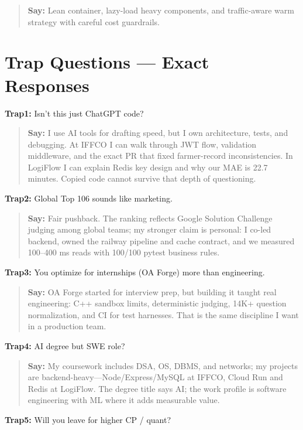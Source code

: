 \documentclass[9pt,a4paper]{article}
\begin{document}
\begin{quote}\small\textbf{Say:} Lean container, lazy-load heavy components, and traffic-aware warm strategy with careful cost guardrails.\end{quote}
\vspace{2mm}
\newpage\section{Trap Questions --- Exact Responses}
\textbf{Trap1:} Isn't this just ChatGPT code?

\begin{quote}\small\textbf{Say:} I use AI tools for drafting speed, but I own architecture, tests, and debugging. At IFFCO I can walk through JWT flow, validation middleware, and the exact PR that fixed farmer-record inconsistencies. In LogiFlow I can explain Redis key design and why our MAE is 22.7 minutes. Copied code cannot survive that depth of questioning.\end{quote}
\vspace{2mm}
\textbf{Trap2:} Global Top 106 sounds like marketing.

\begin{quote}\small\textbf{Say:} Fair pushback. The ranking reflects Google Solution Challenge judging among global teams; my stronger claim is personal: I co-led backend, owned the railway pipeline and cache contract, and we measured 100--400 ms reads with 100/100 pytest business rules.\end{quote}
\vspace{2mm}
\textbf{Trap3:} You optimize for internships (OA Forge) more than engineering.

\begin{quote}\small\textbf{Say:} OA Forge started for interview prep, but building it taught real engineering: C++ sandbox limits, deterministic judging, 14K+ question normalization, and CI for test harnesses. That is the same discipline I want in a production team.\end{quote}
\vspace{2mm}
\textbf{Trap4:} AI degree but SWE role?

\begin{quote}\small\textbf{Say:} My coursework includes DSA, OS, DBMS, and networks; my projects are backend-heavy---Node/Express/MySQL at IFFCO, Cloud Run and Redis at LogiFlow. The degree title says AI; the work profile is software engineering with ML where it adds measurable value.\end{quote}
\vspace{2mm}
\textbf{Trap5:} Will you leave for higher CP / quant?
\end{document}
